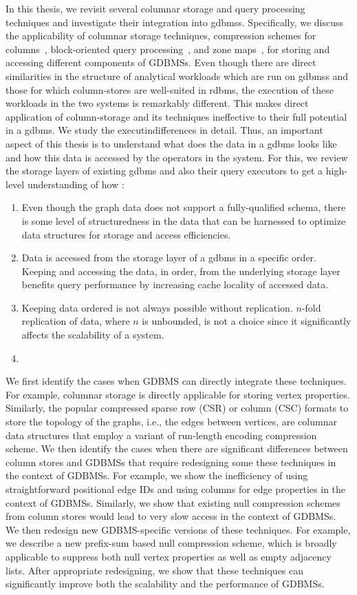In this thesis, we revisit several columnar storage and query processing techniques and investigate their integration into \gls{gdbms}s. Specifically, we discuss the applicability of columnar storage techniques, compression schemes for columns~\cite{}, block-oriented query processing~\cite{}, and zone maps~\cite{}, for storing and accessing different components of GDBMSs. Even though there are direct similarities in the structure of analytical workloads which are run on \gls{gdbms}s and those for which column-stores are well-suited in \gls{rdbms}, the execution of these workloads in the two systems is remarkably different. This makes direct application of column-storage and its techniques ineffective to their full potential in a \gls{gdbms}. We study the executindifferences in detail. Thus, an important aspect of this thesis is to understand what does the data in a \gls{gdbms} looks like and how this data is accessed by the operators in the system. For this, we review the storage layers of existing \gls{gdbms} and also their query executors to get a high-level understanding of how :
\begin{enumerate}
	\item Even though the graph data does not support a fully-qualified schema, there is some level of structuredness in the data that can be harnessed to optimize data structures for storage and access efficiencies.
	\item Data is accessed from the storage layer of a \gls{gdbms} in a specific order. Keeping and accessing the data, in order, from the underlying storage layer benefits query performance by increasing cache locality of accessed data.
	\item Keeping data ordered is not always possible without replication. $n$-fold replication of data, where $n$ is unbounded, is not a choice since it significantly affects the scalability of a system.
	\item 
\end{enumerate}

We first identify the cases when GDBMS can directly integrate these techniques. For example, columnar storage is directly applicable for storing vertex properties. Similarly, the popular compressed sparse row (CSR) or column (CSC) formats to store the topology of the graphs, i.e., the edges between vertices, are columnar data structures that employ a variant of run-length encoding compression scheme. We then identify the cases when there are significant differences between column stores and GDBMSs that require redesigning some these techniques in the context of GDBMSs. For example, we show the inefficiency of using straightforward positional edge IDs and using columns for edge properties in the context of GDBMSs. Similarly, we show that existing null compression schemes from column stores would lead to very slow access in the context of GDBMSs. We then redesign new GDBMS-specific versions of these techniques. For example, we describe a new prefix-sum based null compression scheme, which is broadly applicable to suppress both null vertex properties as well as empty adjacency lists. After appropriate redesigning, we show that these techniques can significantly improve both the scalability and the performance of GDBMSs.

